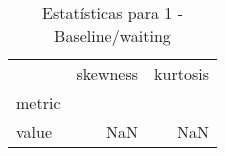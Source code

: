 \begin{table}[htbp]
\caption{Estatísticas para 1 - Baseline/waiting}
\label{tab:1_-_baseline_waiting_skewkurt}
\begin{tabular}{lrr}
\toprule
 & skewness & kurtosis \\
metric &  &  \\
\midrule
value & NaN & NaN \\
\bottomrule
\end{tabular}
\end{table}
